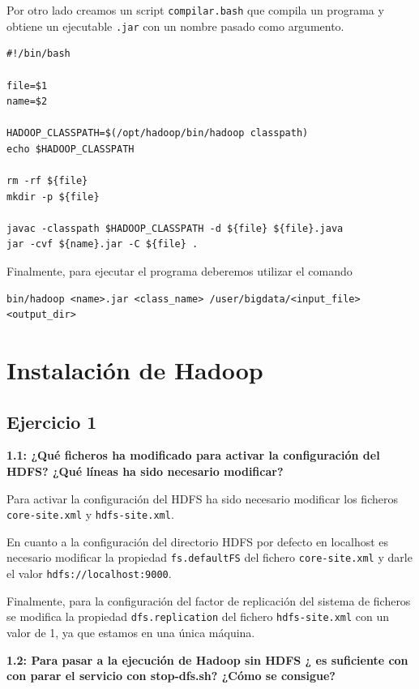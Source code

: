 \documentclass[10pt,swedish, openany]{book}
\begin{document}
Por otro lado creamos un script \texttt{compilar.bash} que compila un programa y obtiene un ejecutable \texttt{.jar} con un nombre pasado como argumento.
\begin{lstlisting}
#!/bin/bash

file=$1
name=$2

HADOOP_CLASSPATH=$(/opt/hadoop/bin/hadoop classpath)
echo $HADOOP_CLASSPATH

rm -rf ${file}
mkdir -p ${file}

javac -classpath $HADOOP_CLASSPATH -d ${file} ${file}.java
jar -cvf ${name}.jar -C ${file} .
\end{lstlisting}

Finalmente, para ejecutar el programa deberemos utilizar el comando
\begin{lstlisting}
bin/hadoop <name>.jar <class_name> /user/bigdata/<input_file> <output_dir>
\end{lstlisting}

\section{Instalación de Hadoop}

\subsection*{Ejercicio 1}
\textbf{1.1: ¿Qué ficheros ha modificado para activar la configuración del HDFS? ¿Qué líneas ha sido necesario modificar?}

Para activar la configuración del HDFS ha sido necesario modificar los ficheros \texttt{core-site.xml} y \texttt{hdfs-site.xml}.

En cuanto a la configuración del directorio HDFS por defecto en localhost es necesario modificar la propiedad \texttt{fs.defaultFS} del fichero \texttt{core-site.xml} y darle el valor \texttt{hdfs://localhost:9000}.

Finalmente, para la configuración del factor de replicación del sistema de ficheros se modifica la propiedad \texttt{dfs.replication} del fichero \texttt{hdfs-site.xml} con un valor de 1, ya que estamos en una única máquina.

\vspace{0.8em}

\textbf{1.2: Para pasar a la ejecución de Hadoop sin HDFS ¿ es suficiente con con parar el servicio con stop-dfs.sh? ¿Cómo se consigue?}
\end{document}
